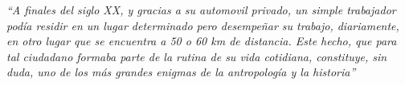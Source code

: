 \documentclass[a4paper, 11pt, twoside]{Thesis}  %
\begin{document}
% 
% 
% 
% 
% 
% 
% 
% 
% 
% 
% 
\clearpage  %

\pagestyle{empty}  %

\null\vfill
\textit{``A finales del siglo XX, y gracias a su automovil privado, un simple
trabajador pod\'{i}a residir en un lugar determinado pero desempe\~nar su trabajo,
diariamente, en otro lugar que se encuentra a 50 o 60 km de distancia. Este
hecho, que para tal ciudadano formaba parte de la rutina de su vida
cotidiana, constituye, sin duda, uno de los m\'{a}s grandes enigmas de la
antropolog\'{i}a y la historia''}
\end{document}
